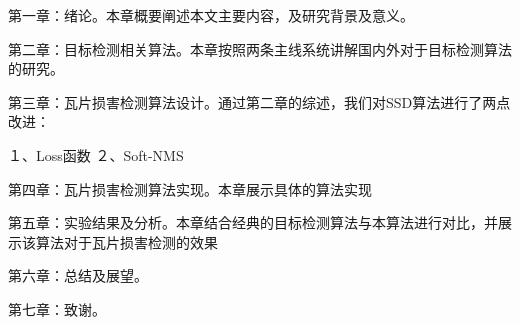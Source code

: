 第一章：绪论。本章概要阐述本文主要内容，及研究背景及意义。

第二章：目标检测相关算法。本章按照两条主线系统讲解国内外对于目标检测算法的研究。

第三章：瓦片损害检测算法设计。通过第二章的综述，我们对SSD算法进行了两点改进：

１、Loss函数
２、Soft-NMS

第四章：瓦片损害检测算法实现。本章展示具体的算法实现

第五章：实验结果及分析。本章结合经典的目标检测算法与本算法进行对比，并展示该算法对于瓦片损害检测的效果　

第六章：总结及展望。

第七章：致谢。